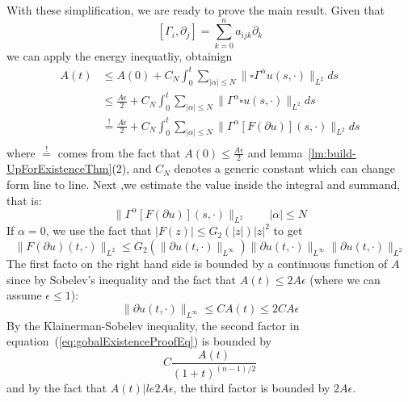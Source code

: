 \documentclass{book}
\newenvironment{Proof}[1][]
  {\begin{ProofTcb}[#1]}
  {\end{ProofTcb}}
\begin{document}
\begin{Proof}
	With these simplification, we are ready to prove the main result. Given that
	\[
		[\Gamma_i,  \partial_j] = \sum_{k=0}^n a_{ijk}  \partial_k
	\]
	we can apply the energy inequatliy, obtainign
	\begin{align*}
		A(t) &\le A(0) + C_N \int_0^t \sum_{|\alpha| \le N} \|\square \Gamma^\alpha u(s, \cdot)\|_{L^2}ds\\
			 &\le \frac{A\epsilon}{2} + C_N \int_0^t \sum_{|\alpha| \le N} \| \Gamma^\alpha \square u(s,
			 \cdot)\|_{L^2}ds\\
			 &\overset{!}{=} \frac{A\epsilon}{2} + C_N \int_0^t \sum_{|\alpha| \le N} \|\Gamma^\alpha [F(
			  \partial u)](s,
			 \cdot)\|_{L^2}ds\\
	\end{align*}
	where $\overset{!}{=}$ comes from the fact that $A(0) \le \frac{A\epsilon}{2}$ and
	lemma~\ref{lm:build-UpForExistenceThm}(2), and $C_N$ denotes a generic constant which can change form line to
	line. Next ,we estimate the value inside the integral and summand, that is:
	\[
		\|\Gamma^\alpha [F( \partial u)](s, \cdot)\|_{L^2} \qquad |\alpha| \le N
	\]
	If $\alpha = 0$, we use the fact that $|F(z)| \le G_2(|z|)|z|^2$ to get
	\begin{equation}\label{eq:gobalExistenceProofEq}
	  \|F(  \partial u )(t, \cdot) \|_{L^2} \le G_2( \|  \partial u(t, \cdot)\|_{L^\infty} )\|  \partial
	  u(t, \cdot)\|_{L^\infty} \|  \partial u(t, \cdot)\|_{L^2}
	\end{equation}
	The first facto on the right hand side is bounded by a continuous function of $A$ since by Sobelev's
	inequality and the fact that $A(t) \le 2A\epsilon$ (where we can assume $\epsilon \le 1$):
	\begin{equation}\label{eq:justEstablishedRes}
	  \|  \partial u(t, \cdot)\|_{L^\infty} \le CA(t) \le 2CA\epsilon
	\end{equation}
	By the Klainerman-Sobelev inequality, the second factor in equation~(\ref{eq:gobalExistenceProofEq}) is
	bounded by
	\[
		C \frac{A(t)}{(1+t)^{(n-1)/2}}
	\]
	and by the fact that $A(t) |le 2A\epsilon$, the third factor is bounded by $2A\epsilon$.


\end{Proof}
\end{document}

